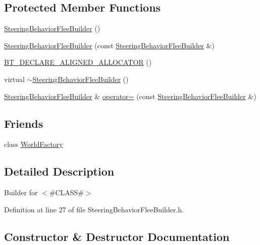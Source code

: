 \subsection*{Protected Member Functions}
\begin{DoxyCompactItemize}
\item 
\mbox{\hyperlink{classnjli_1_1_steering_behavior_flee_builder_a9446e8eaa67998d01e0f44918cb31833}{Steering\+Behavior\+Flee\+Builder}} ()
\item 
\mbox{\hyperlink{classnjli_1_1_steering_behavior_flee_builder_aa905bdd1ab0cc940d4a42af251d765a0}{Steering\+Behavior\+Flee\+Builder}} (const \mbox{\hyperlink{classnjli_1_1_steering_behavior_flee_builder}{Steering\+Behavior\+Flee\+Builder}} \&)
\item 
\mbox{\hyperlink{classnjli_1_1_steering_behavior_flee_builder_a3cf8ee61d02daed1d4b47c5ea858a07a}{B\+T\+\_\+\+D\+E\+C\+L\+A\+R\+E\+\_\+\+A\+L\+I\+G\+N\+E\+D\+\_\+\+A\+L\+L\+O\+C\+A\+T\+OR}} ()
\item 
virtual \mbox{\hyperlink{classnjli_1_1_steering_behavior_flee_builder_aa5cd3135980fb9ec78d330728d80ffba}{$\sim$\+Steering\+Behavior\+Flee\+Builder}} ()
\item 
\mbox{\hyperlink{classnjli_1_1_steering_behavior_flee_builder}{Steering\+Behavior\+Flee\+Builder}} \& \mbox{\hyperlink{classnjli_1_1_steering_behavior_flee_builder_a4e8d08bfa93cbf68e1f6ef46739edb27}{operator=}} (const \mbox{\hyperlink{classnjli_1_1_steering_behavior_flee_builder}{Steering\+Behavior\+Flee\+Builder}} \&)
\end{DoxyCompactItemize}
\subsection*{Friends}
\begin{DoxyCompactItemize}
\item 
class \mbox{\hyperlink{classnjli_1_1_steering_behavior_flee_builder_acb96ebb09abe8f2a37a915a842babfac}{World\+Factory}}
\end{DoxyCompactItemize}


\subsection{Detailed Description}
Builder for $<$\#\+C\+L\+A\+SS\#$>$ 

Definition at line 27 of file Steering\+Behavior\+Flee\+Builder.\+h.



\subsection{Constructor \& Destructor Documentation}
\mbox{\label{classnjli_1_1_steering_behavior_flee_builder_a9446e8eaa67998d01e0f44918cb31833}} 
